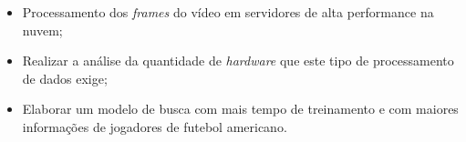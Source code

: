 \begin{itemize}
    \item<1> Processamento dos \textit{frames} do vídeo em servidores de alta performance na nuvem;
    \item<1> Realizar a análise da quantidade de \textit{hardware} que este tipo de processamento de dados exige;
    \item<1> Elaborar um modelo de busca com mais tempo de treinamento e com maiores informações de jogadores de futebol americano.
\end{itemize}